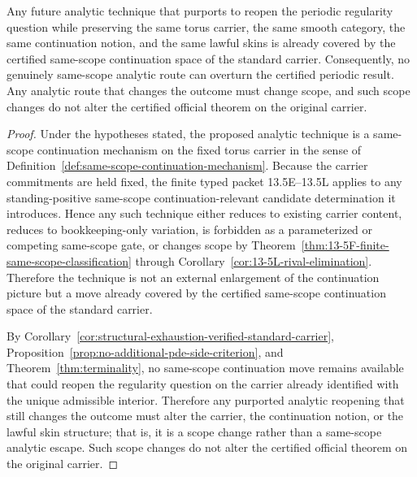 \begin{corollary}\label{cor:no-same-scope-analytic-escape}
Any future analytic technique that purports to reopen the periodic regularity question while preserving
the same torus carrier, the same smooth category, the same continuation notion, and the same lawful
skins is already covered by the certified same-scope continuation space of the standard carrier.
Consequently, no genuinely same-scope analytic route can overturn the certified periodic result.
Any analytic route that changes the outcome must change scope, and such scope changes do not alter
the certified official theorem on the original carrier.
\end{corollary}

\begin{proof}
Under the hypotheses stated, the proposed analytic technique is a same-scope continuation mechanism
on the fixed torus carrier in the sense of Definition~\ref{def:same-scope-continuation-mechanism}.
Because the carrier commitments are held fixed, the finite typed packet 13.5E--13.5L applies to any
standing-positive same-scope continuation-relevant candidate determination it introduces. Hence any
such technique either reduces to existing carrier content, reduces to bookkeeping-only variation, is
forbidden as a parameterized or competing same-scope gate, or changes scope by
Theorem~\ref{thm:13-5F-finite-same-scope-classification} through
Corollary~\ref{cor:13-5L-rival-elimination}. Therefore the technique is not an external enlargement of
the continuation picture but a move already covered by the certified same-scope continuation space of
the standard carrier.

By Corollary~\ref{cor:structural-exhaustion-verified-standard-carrier},
Proposition~\ref{prop:no-additional-pde-side-criterion}, and Theorem~\ref{thm:terminality}, no
same-scope continuation move remains available that could reopen the regularity question on the carrier
already identified with the unique admissible interior. Therefore any purported analytic reopening that
still changes the outcome must alter the carrier, the continuation notion, or the lawful skin
structure; that is, it is a scope change rather than a same-scope analytic escape. Such scope changes
do not alter the certified official theorem on the original carrier.
\end{proof}

